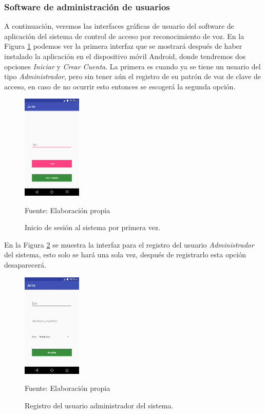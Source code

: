 \subsubsection{Software de administración de usuarios}
A continuación, veremos las interfaces gráficas de usuario del software de aplicación del sistema de control de acceso por reconocimiento de voz. En la Figura \ref{fig:figura3.35} podemos ver la primera interfaz que se mostrará después de haber instalado la aplicación en el dispositivo móvil Android, donde tendremos dos opciones \textit{Iniciar} y \textit{Crear Cuenta}. La primera es cuando ya se tiene un usuario del tipo \textit{Administrador}, pero sin tener aún el registro de su patrón de voz de clave de acceso, en caso de no ocurrir esto entonces se escogerá la segunda opción.
\begin{figure}[H]
\captionsetup{justification=centering}
\begin{center}
\includegraphics[width=0.25\textwidth]{Imagenes/Cap3/image035}
\end{center}
\begin{center}
\vskip -0.5cm
\caption{\small{Inicio de sesión al sistema por primera vez.}}
\label{fig:figura3.35}
{\small{Fuente: Elaboración propia}}
\end{center}
\end{figure}

En la Figura \ref{fig:figura3.36} se muestra la interfaz para el registro del usuario \textit{Administrador} del sistema, esto solo se hará una sola vez, después de registrarlo esta opción desaparecerá.
\begin{figure}[H]
\captionsetup{justification=centering}
\begin{center}
\includegraphics[width=0.25\textwidth]{Imagenes/Cap3/image036}
\end{center}
\begin{center}
\vskip -0.5cm
\caption{\small{Registro del usuario administrador del sistema.}}
\label{fig:figura3.36}
{\small{Fuente: Elaboración propia}}
\end{center}
\end{figure}

